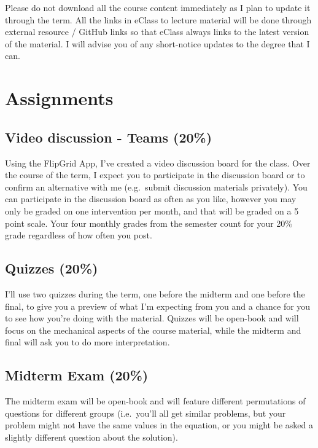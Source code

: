 \documentclass[11pt,]{article}
\begin{document}
Please do not download all the course content immediately as I plan to
update it through the term. All the links in eClass to lecture material
will be done through external resource / GitHub links so that eClass
always links to the latest version of the material. I will advise you of
any short-notice updates to the degree that I can. 

\hypertarget{course-material}{%
\section{Assignments}\label{course-material}}

\hypertarget{video-discussion---teams-20}{%
\subsection{Video discussion - Teams
(20\%)}\label{video-discussion---teams-20}}

Using the FlipGrid App, I've created a video discussion board for the
class. Over the course of the term, I expect you to participate in the
discussion board or to confirm an alternative with me (e.g.~submit
discussion materials privately). You can participate in the discussion
board as often as you like, however you may only be graded on one
intervention per month, and that will be graded on a 5 point scale. Your
four monthly grades from the semester count for your 20\% grade
regardless of how often you post.

\hypertarget{quizzes-20}{%
\subsection{Quizzes (20\%)}\label{quizzes-20}}

I'll use two quizzes during the term, one before the midterm and one
before the final, to give you a preview of what I'm expecting from you
and a chance for you to see how you're doing with the material. Quizzes
will be open-book and will focus on the mechanical aspects of the course
material, while the midterm and final will ask you to do more
interpretation.

\hypertarget{midterm-exam-20}{%
\subsection{Midterm Exam (20\%)}\label{midterm-exam-20}}

The midterm exam will be open-book and will feature different
permutations of questions for different groups (i.e.~you'll all get
similar problems, but your problem might not have the same values in the
equation, or you might be asked a slightly different question about the
solution).
\end{document}
